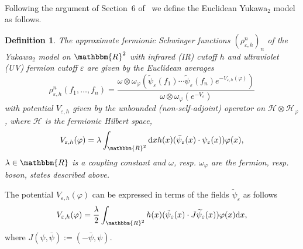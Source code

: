 \documentclass[11pt]{article}
\newcommand{\assign}{:=}
\newcommand{\mathd}{\mathrm{d}}
\newtheorem{definition}{Definition}
\begin{document}
\

Following the argument of Section~6 of~{\cite{osterwalder_euclidean_1973-2}}
we define the Euclidean Yukawa$_2$ model as follows.

\begin{definition}
  \label{def:yukawa2}The approximate fermionic Schwinger functions
  $(\rho^n_{\varepsilon, h})_n$ of the Yukawa$_2$ model on $\mathbbm{R}^2$ with
  infrared (IR) cutoff $h$ and ultraviolet (UV) fermion cutoff $\varepsilon$
  are given by the Euclidean averages
  \begin{equation}
    \rho^n_{\varepsilon, h} (f_1, \ldots, f_n) = \frac{\omega \otimes
    \omega_{\varphi} (\tilde{\psi}_{\varepsilon} (f_1) \cdots
    \tilde{\psi}_{\varepsilon} (f_n) e^{- V_{\varepsilon, h}
    (\varphi)})}{\omega \otimes \omega_{\varphi} (e^{- V_{\varepsilon}})}
    \label{eq:euclidean-yukawa-main}
  \end{equation}
  with potential $V_{\varepsilon, h}$ given by the unbounded
  (non-self-adjoint) operator on $\mathcal{H} \otimes \mathcal{H}_{\varphi}$,
  where $\mathcal{H}$ is the fermionic Hilbert space,
  \begin{equation}
    V_{\varepsilon, h} (\varphi) = \lambda \int_{\mathbbm{R}^2} \mathd x h (x)
    (\bar{\psi}_{\varepsilon} (x) \cdot \psi_{\varepsilon} (x)) \varphi (x),
    \label{eq:yukawa-potential-boson}
  \end{equation}
  $\lambda \in \mathbbm{R}$ is a coupling constant and $\omega$, resp.
  $\omega_{\varphi}$ are the fermion, resp. boson, states described above.
\end{definition}

The potential $V_{\varepsilon, h} (\varphi)$ can be expressed in terms of the
fields $\tilde{\psi}_{\varepsilon}$ as follows
\[ V_{\varepsilon, h} (\varphi) = \frac{\lambda}{2} \int_{\mathbbm{R}^2} h (x)
   (\tilde{\psi}_{\varepsilon} (x) \cdot J \widetilde{\psi}_{\varepsilon} (x))
   \varphi (x) \mathd x, \]
where $J (\psi, \bar{\psi}) \assign (- \bar{\psi}, \psi)$.
\end{document}
